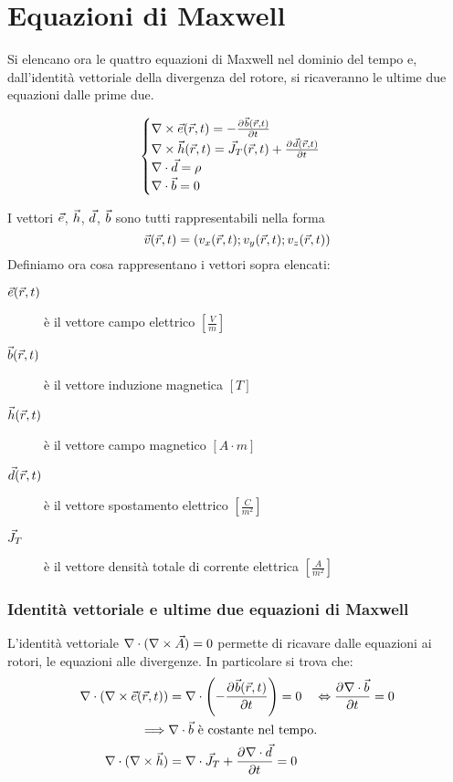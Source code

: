 \section{Equazioni di Maxwell}
Si elencano ora le quattro equazioni di Maxwell nel dominio del tempo e, dall'identità
vettoriale della divergenza del rotore, si ricaveranno le ultime due equazioni dalle prime due.

\begin{equation}\begin{cases}
  \nabla\times \vec{e}(\vec{r},t) = -\frac{\partial^{} {\vec{b}(\vec{r},t)}}{\partial {t}^{}} \\
  \nabla\times \vec{h}(\vec{r},t) = \vec{J}_T(\vec{r},t) + \frac{\partial^{} {\vec{d}(\vec{r},t)}}{\partial {t}^{}} \\
  \nabla\cdot \vec{d} = \rho \\
  \nabla\cdot \vec{b} = 0
\end{cases}\label{eq:maxwell}\end{equation}

I vettori $\vec{e}$, $\vec{h}$, $\vec{d}$, $\vec{b}$ sono tutti rappresentabili nella forma
$$\vec{v}(\vec{r},t) = \left(v_x(\vec{r},t);v_y(\vec{r},t);v_z(\vec{r},t)\right)$$
Definiamo ora cosa rappresentano i vettori sopra elencati:
\begin{description}
  \item[$\vec{e}(\vec{r},t)$] è il vettore campo elettrico $\left[\frac{V}{m}\right]$
  \item[$\vec{b}(\vec{r},t)$] è il vettore induzione magnetica $[T]$
  \item[$\vec{h}(\vec{r},t)$] è il vettore campo magnetico $[A \cdot m]$
  \item[$\vec{d}(\vec{r},t)$] è il vettore spostamento elettrico $\left[\frac{C}{m^2}\right]$
  \item[$\vec{J}_T$] è il vettore densità totale di corrente elettrica $\left[\frac{A}{m^2}\right]$
\end{description}

\subsubsection{Identità vettoriale e ultime due equazioni di Maxwell}
L'identità vettoriale $\nabla\cdot (\nabla\times \vec{A}) = 0$ permette di ricavare
dalle equazioni ai rotori, le equazioni alle divergenze. In particolare si trova che:
\begin{equation}\begin{split}
  \nabla\cdot (\nabla\times \vec{e}(\vec{r},t)) &= \nabla\cdot \left(-\frac{\partial^{} {\vec{b}(\vec{r},t)}}{\partial {t}^{}}\right)=0 \quad \Leftrightarrow \frac{\partial^{} {\nabla\cdot \vec{b}}}{\partial {t}^{}}=0\\
  \implies & \nabla\cdot \vec{b} \text{ è costante nel tempo.}\\
  \nabla\cdot(\nabla\times \vec{h}) &= \nabla\cdot \vec{J}_T + \frac{\partial^{} {\nabla\cdot \vec{d}}}{\partial {t}^{}}=0
\end{split}\end{equation}

